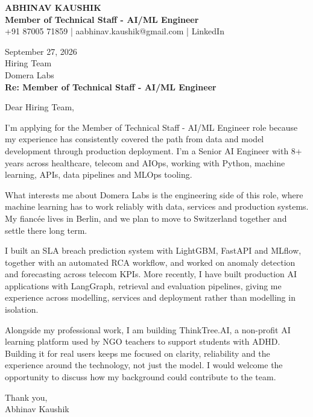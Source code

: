 \documentclass[10pt,a4paper]{article}
\begin{document}
\begin{center}
{\Large\bfseries ABHINAV KAUSHIK}\\[2pt]
{\bfseries Member of Technical Staff - AI/ML Engineer}\\[2pt]
+91 87005 71859 \quad | \quad aabhinav.kaushik@gmail.com \quad | \quad LinkedIn
\end{center}
\vspace{8pt}
September 27, 2026\\[6pt]
Hiring Team\\
Domera Labs\\[4pt]
\textbf{Re: Member of Technical Staff - AI/ML Engineer}

Dear Hiring Team,

I’m applying for the Member of Technical Staff - AI/ML Engineer role because my experience has consistently covered the path from data and model development through production deployment. I’m a Senior AI Engineer with 8+ years across healthcare, telecom and AIOps, working with Python, machine learning, APIs, data pipelines and MLOps tooling.

What interests me about Domera Labs is the engineering side of this role, where machine learning has to work reliably with data, services and production systems. My fiancée lives in Berlin, and we plan to move to Switzerland together and settle there long term.

I built an SLA breach prediction system with LightGBM, FastAPI and MLflow, together with an automated RCA workflow, and worked on anomaly detection and forecasting across telecom KPIs. More recently, I have built production AI applications with LangGraph, retrieval and evaluation pipelines, giving me experience across modelling, services and deployment rather than modelling in isolation.

Alongside my professional work, I am building ThinkTree.AI, a non-profit AI learning platform used by NGO teachers to support students with ADHD. Building it for real users keeps me focused on clarity, reliability and the experience around the technology, not just the model. I would welcome the opportunity to discuss how my background could contribute to the team.

Thank you,\\
Abhinav Kaushik
\end{document}
